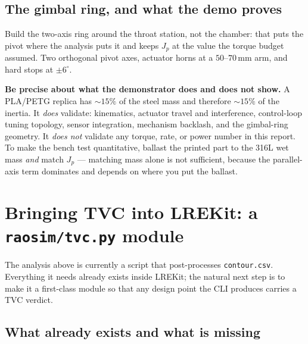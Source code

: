 \documentclass[11pt]{article}
\newcommand{\cmd}[1]{\nolinkurl{#1}}
\begin{document}
\subsection{The gimbal ring, and what the demo proves}

Build the two-axis ring around the throat station, not the chamber: that puts
the pivot where the analysis puts it and keeps $J_p$ at the value the torque
budget assumed. Two orthogonal pivot axes, actuator horns at a
$50$--$70$\,mm arm, and hard stops at $\pm6^\circ$.

\begin{warnbox}
\textbf{Be precise about what the demonstrator does and does not show.}
A PLA/PETG replica has $\sim$$15\%$ of the steel mass and therefore
$\sim$$15\%$ of the inertia. It \emph{does} validate: kinematics, actuator
travel and interference, control-loop tuning topology, sensor integration,
mechanism backlash, and the gimbal-ring geometry. It \emph{does not} validate
any torque, rate, or power number in this report. To make the bench test
quantitative, ballast the printed part to the 316L wet mass \emph{and} match
$J_p$ --- matching mass alone is not sufficient, because the parallel-axis
term dominates and depends on where you put the ballast.
\end{warnbox}

\section{Bringing TVC into LREKit: a \texttt{raosim/tvc.py} module}

The analysis above is currently a script that post-processes
\cmd{contour.csv}. Everything it needs already exists inside LREKit; the
natural next step is to make it a first-class module so that any design point
the CLI produces carries a TVC verdict.

\subsection{What already exists and what is missing}
\end{document}
